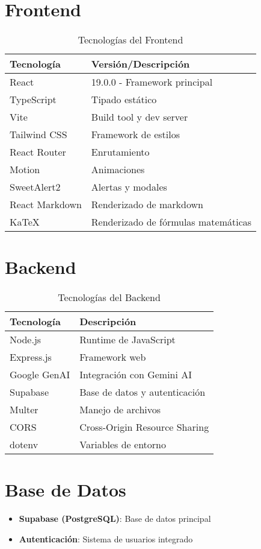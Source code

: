 \documentclass[12pt,a4paper]{report}
\begin{document}
\section{Frontend}
\begin{table}[h]
\centering
\begin{tabular}{ll}
\toprule
\textbf{Tecnología} & \textbf{Versión/Descripción} \\
\midrule
React & 19.0.0 - Framework principal \\
TypeScript & Tipado estático \\
Vite & Build tool y dev server \\
Tailwind CSS & Framework de estilos \\
React Router & Enrutamiento \\
Motion & Animaciones \\
SweetAlert2 & Alertas y modales \\
React Markdown & Renderizado de markdown \\
KaTeX & Renderizado de fórmulas matemáticas \\
\bottomrule
\end{tabular}
\caption{Tecnologías del Frontend}
\end{table}

\section{Backend}
\begin{table}[h]
\centering
\begin{tabular}{ll}
\toprule
\textbf{Tecnología} & \textbf{Descripción} \\
\midrule
Node.js & Runtime de JavaScript \\
Express.js & Framework web \\
Google GenAI & Integración con Gemini AI \\
Supabase & Base de datos y autenticación \\
Multer & Manejo de archivos \\
CORS & Cross-Origin Resource Sharing \\
dotenv & Variables de entorno \\
\bottomrule
\end{tabular}
\caption{Tecnologías del Backend}
\end{table}

\section{Base de Datos}
\begin{itemize}
    \item \textbf{Supabase (PostgreSQL)}: Base de datos principal
    \item \textbf{Autenticación}: Sistema de usuarios integrado
\end{itemize}
\end{document}
